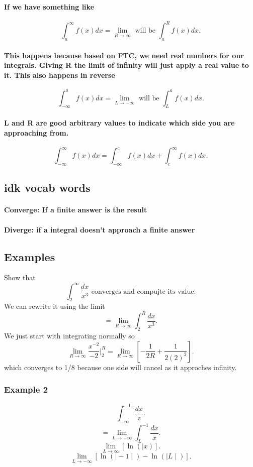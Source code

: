 \documentclass[a4paper]{article}
\begin{document}
\paragraph{If we have something like }
\[
  \int_{a}^{\infty} f(x)dx=\lim_{R \to \infty} \text{ will be }\int_{a}^{R} f(x)dx  
.\] 
\paragraph{This happens because based on FTC, we need real numbers for our integrals. Giving R the limit of infinity will just apply a real value to it. This also happens in reverse}
\newpage
\[
\int_{-\infty}^{a} f(x)dx=\lim_{L \to -\infty} \text{ will be }\int_{L}^{a} f(x)dx  
.\] 
\paragraph{L and R are good arbitrary values to indicate which side you are approaching from. }
\[
\int_{-\infty}^{\infty} f(x)dx=\int_{-\infty}^{c} f(x)dx+\int_{c}^{\infty} f(x)dx   
.\] 


\subsection{idk vocab words}%
\label{sub:idk vocab words}
\paragraph{Converge: If a finite answer is the result}
\paragraph{Diverge: if a integral doesn't approach a finite answer}

\subsection{Examples}%
\label{sub:Examples}
Show that
\[
\int_{2}^{\infty} \frac{dx}{x^3}\text{ converges and compujte its value} 
.\] 
We can rewrite it using the limit
\[
=\lim_{R \to \infty} \int_{2}^{R} \frac{dx}{x^3} 
.\] 
We just start with integrating normally so
\[
  \lim_{R \to \infty} \frac{x^{-2}}{-2}|_{2}^{R}=\lim_{R \to \infty} \left[-\frac{1}{2R}+\frac{1}{2(2)^2}\right]
.\] 
which converges to 1/8 because one side will cancel as it approches infinity.

\subsubsection{Example 2}
\[
  \int_{-\infty}^{-1} \frac{dx}{z} 
.\] 
\[
=\lim_{L \to - \infty} \int_{L}^{-1} \frac{dx}{x}
.\] 
\[
  \lim_{L \to \infty} [\ln^{}( \mid x)]
.\] 
\[
  \lim_{L \to -\infty}\left[\ln^{}( \mid -1\mid)-\ln^{}( \mid L\mid)\right]
.\] 
\end{document}
